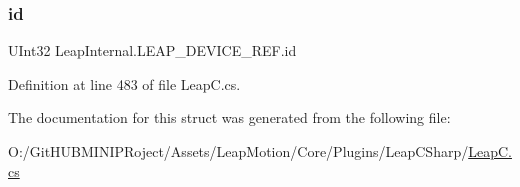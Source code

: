 \subsubsection{\texorpdfstring{id}{id}}
{\footnotesize\ttfamily U\+Int32 Leap\+Internal.\+L\+E\+A\+P\+\_\+\+D\+E\+V\+I\+C\+E\+\_\+\+R\+E\+F.\+id}



Definition at line 483 of file Leap\+C.\+cs.



The documentation for this struct was generated from the following file\+:\begin{DoxyCompactItemize}
\item 
O\+:/\+Git\+H\+U\+B\+M\+I\+N\+I\+P\+Roject/\+Assets/\+Leap\+Motion/\+Core/\+Plugins/\+Leap\+C\+Sharp/\mbox{\hyperlink{_leap_c_8cs}{Leap\+C.\+cs}}\end{DoxyCompactItemize}
